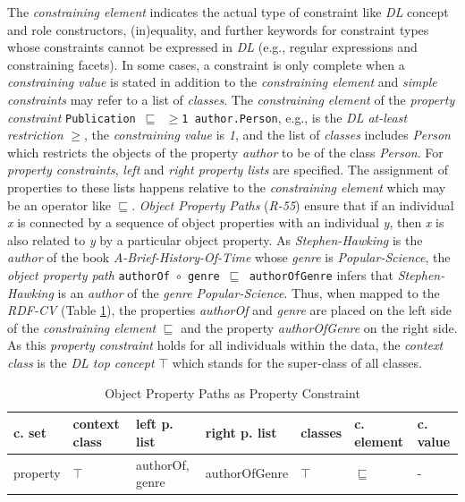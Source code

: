 \documentclass[a4paper,fontsize=11pt]{scrartcl}
\newcommand{\ms}[1]{\texttt{#1}}
\begin{document}
The \emph{constraining element} indicates the actual type of constraint like \emph{DL} concept and role constructors, (in)equality, and further keywords for constraint types whose constraints cannot be expressed in \emph{DL} (e.g., regular expressions and constraining facets).
In some cases, a constraint is only complete when a \emph{constraining value} is stated in addition to the \emph{constraining element}
and \emph{simple constraints} may refer to a list of \emph{classes}.
The \emph{constraining element} of the \emph{property constraint} {\small\ms{Publication $\sqsubseteq$ $\geq$1 author.Person},} e.g.,  is the \emph{DL at-least restriction} \emph{$\geq$}, the \emph{constraining value} is \emph{1}, and
the list of \emph{classes} includes \emph{Person} which restricts the objects of the property \emph{author} to be of the class \emph{Person}.
For \emph{property constraints}, \emph{left} and \emph{right property lists} are specified.
The assignment of properties to these lists happens relative to the \emph{constraining element} 
which may be an operator like $\sqsubseteq$.
\emph{Object Property Paths} (\emph{R-55})
ensure that if an individual \emph{x} is connected by a sequence of object properties with an individual \emph{y}, 
then \emph{x} is also related to \emph{y} by a particular object property. 
As \emph{Stephen-Hawking} is the \emph{author} of the book \emph{A-Brief-History-Of-Time} 
whose \emph{genre} is \emph{Popular-Science}, 
the \emph{object property path} {\small\ms{authorOf $\circ$ genre $\sqsubseteq$ authorOfGenre}} infers that \emph{Stephen-Hawking} is an \emph{author} of the \emph{genre} \emph{Popular-Science}. 
Thus, when mapped to the \emph{RDF-CV} (Table \ref{tab:property-constraint-object-property-paths}), the properties \emph{authorOf} and \emph{genre} are placed on the left side of the \emph{constraining element} \emph{$\sqsubseteq$}
and the property \emph{authorOfGenre} on the right side.
As this \emph{property constraint} holds for all individuals within the data, the \emph{context class} is the \emph{DL top concept} $\top$ which stands for the super-class of all classes.
\begin{table}[H]
  \scriptsize
  \sffamily
  \vspace{0cm}
	\caption{Object Property Paths as Property Constraint}
	\label{tab:property-constraint-object-property-paths}
	\centering
		\begin{tabular}{l|l|l|l|l|l|l}
      \textbf{c. set} & \textbf{context class} & \textbf{left p. list} & \textbf{right p. list} & \textbf{classes} & \textbf{c. element} & \textbf{c. value} \\
      \hline
      property & $\top$ & authorOf, genre & authorOfGenre & $\top$ & $\sqsubseteq$ & - \\
		\end{tabular}
\end{table}
\end{document}
